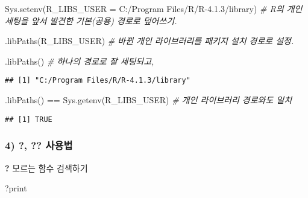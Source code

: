 \documentclass[
  12,
]{article}
\newenvironment{Shaded}{\begin{snugshade}}{\end{snugshade}}
\newcommand{\CommentTok}[1]{\textcolor[rgb]{0.56,0.35,0.01}{\textit{#1}}}
\newcommand{\FunctionTok}[1]{\textcolor[rgb]{0.00,0.00,0.00}{#1}}
\newcommand{\NormalTok}[1]{#1}
\newcommand{\OtherTok}[1]{\textcolor[rgb]{0.56,0.35,0.01}{#1}}
\newcommand{\SpecialCharTok}[1]{\textcolor[rgb]{0.00,0.00,0.00}{#1}}
\newcommand{\StringTok}[1]{\textcolor[rgb]{0.31,0.60,0.02}{#1}}
\begin{document}
\begin{Shaded}
\begin{Highlighting}[]
\FunctionTok{Sys.setenv}\NormalTok{(}\StringTok{\textquotesingle{}R\_LIBS\_USER\textquotesingle{}} \OtherTok{=} \StringTok{\textquotesingle{}C:/Program Files/R/R{-}4.1.3/library\textquotesingle{}}\NormalTok{) }
\CommentTok{\# R의 \textquotesingle{}개인\textquotesingle{} 세팅을 앞서 발견한 \textquotesingle{}기본(공용)\textquotesingle{} 경로로 덮어쓰기.}

\FunctionTok{.libPaths}\NormalTok{(}\StringTok{\textquotesingle{}R\_LIBS\_USER\textquotesingle{}}\NormalTok{) }\CommentTok{\# 바뀐 \textquotesingle{}개인 라이브러리\textquotesingle{}를 패키지 설치 경로로 설정.}
\end{Highlighting}
\end{Shaded}

\begin{Shaded}
\begin{Highlighting}[]
\FunctionTok{.libPaths}\NormalTok{() }\CommentTok{\# 하나의 경로로 잘 세팅되고,}
\end{Highlighting}
\end{Shaded}

\begin{verbatim}
## [1] "C:/Program Files/R/R-4.1.3/library"
\end{verbatim}

\begin{Shaded}
\begin{Highlighting}[]
\FunctionTok{.libPaths}\NormalTok{() }\SpecialCharTok{==} \FunctionTok{Sys.getenv}\NormalTok{(}\StringTok{\textquotesingle{}R\_LIBS\_USER\textquotesingle{}}\NormalTok{) }\CommentTok{\# 개인 라이브러리 경로와도 일치}
\end{Highlighting}
\end{Shaded}

\begin{verbatim}
## [1] TRUE
\end{verbatim}

\hypertarget{uxc0acuxc6a9uxbc95}{%
\subsubsection{4) ?, ?? 사용법}\label{uxc0acuxc6a9uxbc95}}

\textbf{?} 모르는 함수 검색하기

\begin{Shaded}
\begin{Highlighting}[]
\NormalTok{?print}
\end{Highlighting}
\end{Shaded}
\end{document}

